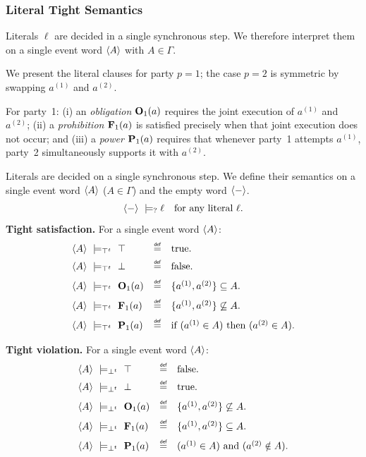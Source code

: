 \subsubsection*{Literal Tight Semantics}
Literals $\ell$ are decided in a single synchronous step.
We therefore interpret them on a single event word $\trace{A}$ with $A\in\Gamma$.

\par
We present the literal clauses for party $p=1$; the case $p=2$ is symmetric by swapping $a^{(1)}$ and $a^{(2)}$.

For party~1:
(i) an \emph{obligation} $\obl[1]{a}$ requires the joint execution of $a^{(1)}$ and $a^{(2)}$;
(ii) a \emph{prohibition} $\frb[1]{a}$ is satisfied precisely when that joint execution does not occur; and
(iii) a \emph{power} $\perm[1]{a}$ requires that whenever party~1 attempts $a^{(1)}$,
party~2 simultaneously supports it with $a^{(2)}$.

%
\begin{definition}\label{def:lattsat}
  Literals are decided on a single synchronous step. We define their semantics on a single event word $\trace{A}$ ($A\in\Gamma$) and the empty word $\emptytrace$.
  \[
  \emptytrace\ \presat \ell \quad \text{for any literal } \ell.
  \]
  \smallskip
  \noindent\textbf{Tight satisfaction.}
  For a single event word $\trace{A}$:
  \[
  \begin{array}{l@{\quad}c@{\quad}l}
  \trace{A}\ \satt\ \top      &\mydef& \text{true}.\\[4pt]
  \trace{A}\ \satt\ \bot      &\mydef& \text{false}.\\[6pt]
  \trace{A}\ \satt\ \obl[1]{a} &\mydef& \{a^{(1)},a^{(2)}\}\subseteq A.\\[6pt]
  \trace{A}\ \satt\ \frb[1]{a} &\mydef& \{a^{(1)},a^{(2)}\}\not\subseteq A.\\[6pt]
  \trace{A}\ \satt\ \perm[1]{a} &\mydef& \text{if }(a^{(1)}\in A) \text{ then }(a^{(2)}\in A).
  \end{array}
  \]
  
  \noindent\textbf{Tight violation.}
  For a single event word $\trace{A}$:
  \[
  \begin{array}{l@{\quad}c@{\quad}l}
  \trace{A}\ \violt\ \top      &\mydef& \text{false}.\\[4pt]
  \trace{A}\ \violt\ \bot      &\mydef& \text{true}.\\[6pt]
  \trace{A}\ \violt\ \obl[1]{a} &\mydef& \{a^{(1)},a^{(2)}\}\not\subseteq A.\\[6pt]
  \trace{A}\ \violt\ \frb[1]{a} &\mydef& \{a^{(1)},a^{(2)}\}\subseteq A.\\[6pt]
  \trace{A}\ \violt\ \perm[1]{a} &\mydef& (a^{(1)}\in A) \nd (a^{(2)}\notin A).
  \end{array}
  \]
  \end{definition}

